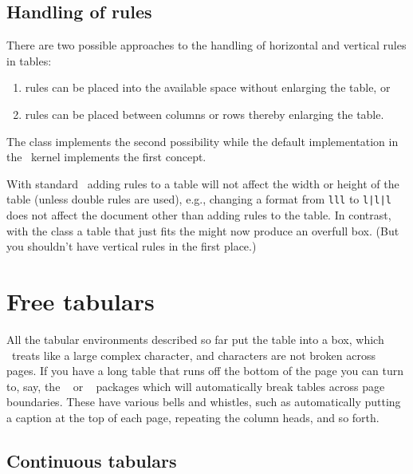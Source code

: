 {{{{{{ \subsection{Handling of rules}
 
 There are two possible approaches to the handling of horizontal and
 vertical rules in tables:
 \begin{enumerate}
   \item rules can be placed into the available space without
   enlarging the table, or
   \item rules can be placed between columns or rows thereby enlarging
   the table.
 \end{enumerate}
 The class implements the second possibility while the
 default implementation in the \ltx\ kernel implements the first
 concept. 

   With standard \ltx\ adding rules to a table will not affect the
   width or height of the table (unless double rules are used), e.g.,
   changing a format from \verb?lll? to \verb?l|l|l? does not
   affect the document other than adding rules to the table. In
   contrast, with the class a table that just fits the
   \lnc{\textwidth} might now produce an overfull box.
(But you shouldn't have vertical rules in the first place.)


\section{Free tabulars}


    All the tabular environments described so far put the table
into a box, which \ltx\ treats like a large complex
character, and characters are not broken across pages. 
If you
have a long table that runs off the bottom of 
the page you can turn
to, say, the ~\cite{LONGTABLE} or ~\cite{XTAB}
packages which will automatically break tables across page boundaries.
These have various bells and whistles, such as automatically putting
a caption at the top of each page, repeating the column heads, and 
so forth. 

\subsection{Continuous tabulars}


}}}}}}
